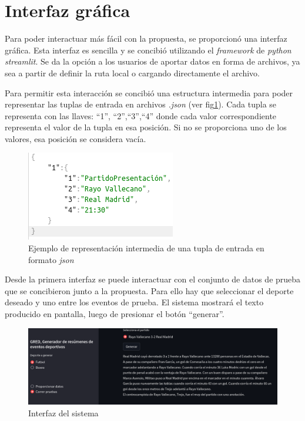 \section{Interfaz gráfica}

Para poder interactuar más fácil con la propuesta, se proporcionó una interfaz gráfica. Esta interfaz es sencilla
y se concibió utilizando el \emph{framework} de \textit{python streamlit}. Se da la opción a los usuarios de aportar
 datos en forma de archivos, ya sea a partir de definir la ruta local o cargando directamente el archivo.

 Para permitir  esta interacción se concibió una estructura intermedia para poder representar las tuplas 
de entrada en archivos \textit{.json} (ver fig\ref{fig_jsonexample}). Cada tupla se representa con las llaves: “1”, “2”,“3”,“4”
donde cada valor correspondiente representa el valor de la tupla en esa posición. Si no se proporciona uno de los 
valores, esa posición se considera vacía.

    \begin{figure}[!]
        \begin{center}
            \includegraphics[scale=0.6]{Graphics/jsonexample.png}
        \end{center}
        \caption{Ejemplo de representación intermedia de una tupla de entrada en formato \textit{json}}
        \label{fig_jsonexample}
    \end{figure}

 Desde la primera interfaz se puede interactuar con el conjunto de datos de prueba que se concibieron
junto a la propuesta. Para ello hay que seleccionar el deporte deseado y uno entre los eventos de prueba.
El sistema mostrará el texto producido en pantalla, luego de presionar el botón “generar”.



\begin{figure}[!]
    \begin{center}
        \includegraphics[width=\textwidth]{Graphics/GRED.png}
    \end{center}
    \caption{Interfaz del sistema}
    \label{fig_interfaz}
\end{figure}

